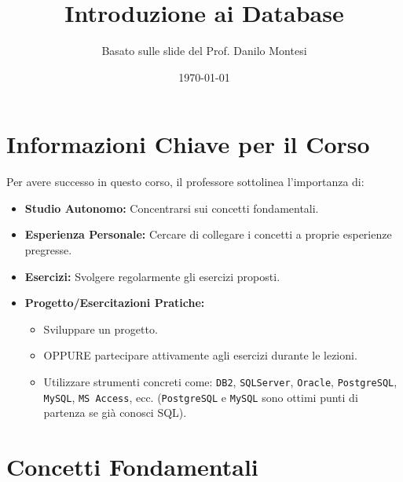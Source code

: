 

\usepackage{hyperref}

\title{Introduzione ai Database}
\author{Basato sulle slide del Prof. Danilo Montesi}
\date{\today}


	
	\maketitle
	\tableofcontents
	\newpage
	
	\section{Informazioni Chiave per il Corso}
	Per avere successo in questo corso, il professore sottolinea l'importanza di:
	\begin{itemize}
		\item \textbf{Studio Autonomo:} Concentrarsi sui concetti fondamentali.
		\item \textbf{Esperienza Personale:} Cercare di collegare i concetti a proprie esperienze pregresse.
		\item \textbf{Esercizi:} Svolgere regolarmente gli esercizi proposti.
		\item \textbf{Progetto/Esercitazioni Pratiche:}
		\begin{itemize}
			\item Sviluppare un progetto.
			\item OPPURE partecipare attivamente agli esercizi durante le lezioni.
			\item Utilizzare strumenti concreti come: \texttt{DB2}, \texttt{SQLServer}, \texttt{Oracle}, \texttt{PostgreSQL}, \texttt{MySQL}, \texttt{MS Access}, ecc. (\texttt{PostgreSQL} e \texttt{MySQL} sono ottimi punti di partenza se già conosci SQL).
		\end{itemize}
	\end{itemize}
	
	\section{Concetti Fondamentali}
	
